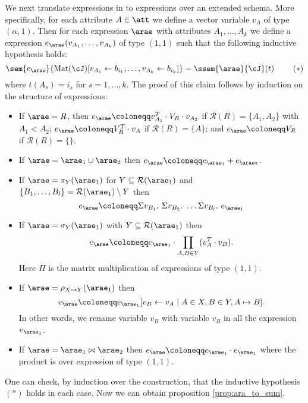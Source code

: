 We next translate \rak expressions in to \langsum expressions over an extended schema. More specifically, for each attribute $A \in \att$ we define a vector variable $v_A$ of type $(\alpha,1)$. Then for each \rak expression $\arae$ with attributes $A_1, \ldots, A_k$ we define a \langsum expression $\earae(v_{A_1}, \ldots, v_{A_k})$ of type $(1,1)$ such that the following inductive hypothesis holds:
$$
\sem{\earae}{\text{Mat}(\cJ)[v_{A_1} \gets b_{i_1},\ldots, v_{A_k} \gets b_{i_k}]} = 
\ssem{\arae}{\cJ}(t) \ \ \ \ \ \ \  (*)
$$
where $t(A_s)=i_s$ for $s=1,\ldots, k$. The proof of this claim follows by induction on the structure of expressions:
\begin{itemize} \itemsep3mm
	\item If $\arae=R$, then $\earae\coloneqq v_{A_1}^T \cdot V_R \cdot v_{A_2}$ if $\mathcal{R}(R)=\{A_1,A_2\}$ with $A_1<A_2$; 
	$\earae\coloneqq V_R^T \cdot v_A$ if $\mathcal{R}(R)=\{A\}$; and 
	$\earae\coloneqq V_R$ if $\mathcal{R}(R)=\{\}$.
	\item If $\arae=\arae_1\cup \arae_2$ then
	$\earae\coloneqq e_{\arae_1} + e_{\arae_2}$.
	\item If $\arae=\pi_{Y}(\arae_1)$ for $Y\subseteq \mathcal{R}(\arae_1)$ and $\{B_1, \ldots, B_l\} = \mathcal{R}(\arae_1) \setminus Y$ then
	$$
	\earae\coloneqq  \Sigma v_{B_1}. \ \Sigma v_{B_2}. \ \ldots \Sigma v_{B_l}. \ e_{\arae_1}
	$$
	\item If $\arae=\sigma_{Y}(\arae_1)$ with $Y\subseteq\mathcal{R}(\arae_1)$ then
	$$
	\earae\coloneqq e_{\arae_1}\cdot \prod_{A,B\in Y} (v_{A}^T \cdot v_{B}).
	$$
	Here $\Pi$ is the matrix multiplication of expressions of type $(1,1)$.
	\item If $\arae=\rho_{X\mapsto Y}(\arae_1)$ then
	$$\earae\coloneqq e_{\arae_1}[v_B\gets v_A\mid A\in X, B\in Y, A\mapsto B].$$
	In other words, we rename variable $v_B$ with variable $v_B$ in all the expression $e_{\arae_1}$. 
	\item If $\arae=\arae_1\bowtie \arae_2$ then
	$\earae\coloneqq e_{\arae_1} \cdot e_{\arae_1}$ where the product is over expression of type $(1,1)$.
\end{itemize}
One can check, by induction over the construction, that the inductive hypothesis $(*)$ holds in each case.
Now we can obtain proposition \ref{prop:ara_to_sum}.

\newtheorem*{ARATOSUM}{Proposition~\ref{prop:ara_to_sum}}

